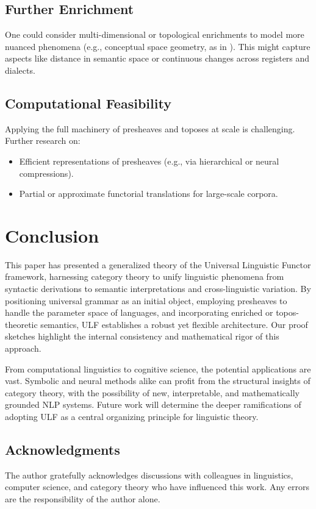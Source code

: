 \documentclass[12pt]{article}
\theoremstyle{plain}
\theoremstyle{definition}
\begin{document}
\subsection{Further Enrichment}
One could consider multi-dimensional or topological enrichments to model more nuanced phenomena (e.g., conceptual space geometry, as in \cite{Gardenfors}). This might capture aspects like distance in semantic space or continuous changes across registers and dialects.

\subsection{Computational Feasibility}
Applying the full machinery of presheaves and toposes at scale is challenging. Further research on:
\begin{itemize}
    \item Efficient representations of presheaves (e.g., via hierarchical or neural compressions).
    \item Partial or approximate functorial translations for large-scale corpora.
\end{itemize}

\section{Conclusion}
This paper has presented a generalized theory of the Universal Linguistic Functor framework, harnessing category theory to unify linguistic phenomena from syntactic derivations to semantic interpretations and cross-linguistic variation. By positioning universal grammar as an initial object, employing presheaves to handle the parameter space of languages, and incorporating enriched or topos-theoretic semantics, ULF establishes a robust yet flexible architecture. Our proof sketches highlight the internal consistency and mathematical rigor of this approach.

From computational linguistics to cognitive science, the potential applications are vast. Symbolic and neural methods alike can profit from the structural insights of category theory, with the possibility of new, interpretable, and mathematically grounded NLP systems. Future work will determine the deeper ramifications of adopting ULF as a central organizing principle for linguistic theory.

\subsection*{Acknowledgments}
The author gratefully acknowledges discussions with colleagues in linguistics, computer science, and category theory who have influenced this work. Any errors are the responsibility of the author alone.
\end{document}
